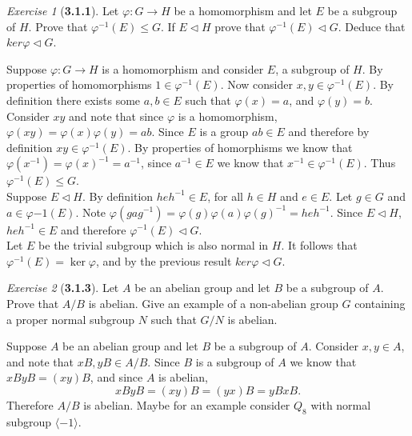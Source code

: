 \documentclass[12pt]{amsart}
\makeatletter
\theoremstyle{remark}
\newtheorem*{exercise}{Exercise}%
\renewenvironment{proof}[1][\proofname]{\par\doublespacing
  \pushQED{\qed}%
  \normalfont \topsep6\p@\@plus6\p@\relax
  \list{}{%
    \settowidth{\leftmargin}{\itshape\proofname:\hskip\labelsep}%
    \setlength{\labelwidth}{0pt}%
    \setlength{\itemindent}{-\leftmargin}%
  }%
  \item[\hskip\labelsep\itshape#1\@addpunct{:}]\ignorespaces
}{%
  \popQED\endlist\@endpefalse
  \singlespacing
}
\theoremstyle{mycomment}
\makeatother
\begin{document}
\begin{exercise}[\textbf{3.1.1}] Let $\varphi : G \to H$ be a homomorphism and let $E$ be a subgroup of $H$. Prove that $\varphi^{-1}(E) \leq G$. 
  If $E\lhd H$ prove that $\varphi^{-1}(E)\lhd G$. Deduce that $ker \varphi \lhd G$.
  \begin{proof} Suppose $\varphi : G \to H$ is a homomorphism and consider $E$, a subgroup of $H$. By properties of homomorphisms $1 \in \varphi^{-1}(E)$. Now consider 
    $x, y \in \varphi^{-1}(E)$. By definition there exists some $a, b \in E$ such that $\varphi(x) = a$, and $\varphi(y) = b$. Consider $xy$ and note that since $\varphi$ is a homomorphism, 
    $\varphi(xy) = \varphi(x)\varphi(y) = ab$. Since $E$ is a group $ab \in E$ and therefore by definition $xy \in \varphi^{-1}(E)$. By properties of homorphisms we know that 
    $\varphi(x^{-1}) = \varphi(x)^{-1} = a^{-1}$, since $a^{-1} \in E$ we know that $x^{-1} \in \varphi^{-1}(E)$. Thus $\varphi^{-1}(E) \leq G$. \\

    Suppose $E\lhd H$. By definition $heh^{-1} \in E$, for all $h \in H$ and $e \in E$. Let $g \in G$ and $a \in \varphi{-1}(E)$. Note 
    $\varphi(gag^{-1}) = \varphi(g)\varphi(a)\varphi(g)^{-1} = heh^{-1}$. Since $E\lhd H$, $heh^{-1} \in E$ and therefore $\varphi^{-1}(E)\lhd G$.\\

   Let $E$ be the trivial subgroup which is also normal in $H$. It follows that $\varphi^{-1}(E) = \ker \varphi$, and by the previous result $ker \varphi \lhd G$. 
  \end{proof}

\end{exercise}
\vspace{.15in}


\begin{exercise}[\textbf{3.1.3}] Let $A$ be an abelian group and let $B$ be a subgroup of $A$. Prove that $A/B$ is abelian. Give an 
  example of a non-abelian group $G$ containing a proper normal subgroup $N$ such that $G/N$ is abelian.\\

    \begin{proof} Suppose $A$ be an abelian group and let $B$ be a subgroup of $A$. Consider $x, y \in A$, and note that 
      $xB, yB \in A/B$. Since $B$ is a subgroup of $A$ we know that $xByB = (xy)B$, and since $A$ is abelian, 
      \begin{equation*}
        xByB = (xy)B = (yx)B = yBxB.
      \end{equation*}
      Therefore $A/B$ is abelian.
      \end{proof}
      Maybe for an example consider $Q_8$ with normal subgroup $\langle -1 \rangle$. 

\end{exercise}
\vspace{.15in}
\end{document}
